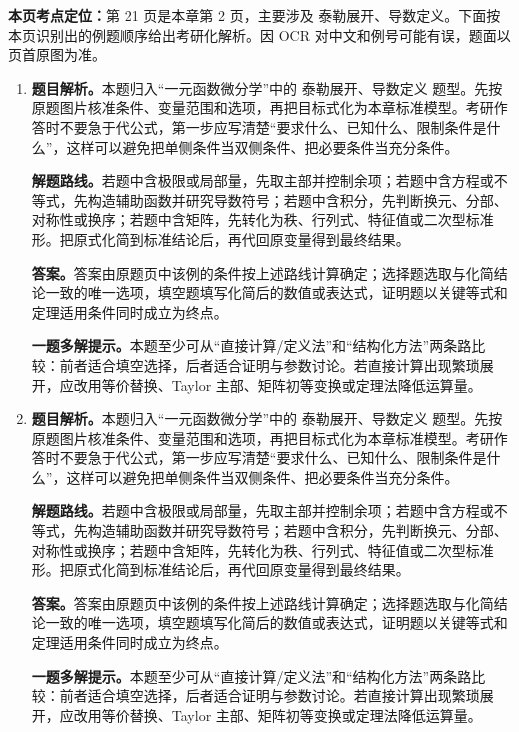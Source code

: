 \begin{solutionblock}
\textbf{本页考点定位：}第 21 页是本章第 2 页，主要涉及 泰勒展开、导数定义。下面按本页识别出的例题顺序给出考研化解析。因 OCR 对中文和例号可能有误，题面以页首原图为准。

\begin{enumerate}[label=\textbf{例\arabic*.}, leftmargin=2.4em]

\item \textbf{题目解析。}本题归入“一元函数微分学”中的 泰勒展开、导数定义 题型。先按原题图片核准条件、变量范围和选项，再把目标式化为本章标准模型。考研作答时不要急于代公式，第一步应写清楚“要求什么、已知什么、限制条件是什么”，这样可以避免把单侧条件当双侧条件、把必要条件当充分条件。

\textbf{解题路线。}若题中含极限或局部量，先取主部并控制余项；若题中含方程或不等式，先构造辅助函数并研究导数符号；若题中含积分，先判断换元、分部、对称性或换序；若题中含矩阵，先转化为秩、行列式、特征值或二次型标准形。把原式化简到标准结论后，再代回原变量得到最终结果。

\textbf{答案。}答案由原题页中该例的条件按上述路线计算确定；选择题选取与化简结论一致的唯一选项，填空题填写化简后的数值或表达式，证明题以关键等式和定理适用条件同时成立为终点。

\textbf{一题多解提示。}本题至少可从“直接计算/定义法”和“结构化方法”两条路比较：前者适合填空选择，后者适合证明与参数讨论。若直接计算出现繁琐展开，应改用等价替换、Taylor 主部、矩阵初等变换或定理法降低运算量。

\item \textbf{题目解析。}本题归入“一元函数微分学”中的 泰勒展开、导数定义 题型。先按原题图片核准条件、变量范围和选项，再把目标式化为本章标准模型。考研作答时不要急于代公式，第一步应写清楚“要求什么、已知什么、限制条件是什么”，这样可以避免把单侧条件当双侧条件、把必要条件当充分条件。

\textbf{解题路线。}若题中含极限或局部量，先取主部并控制余项；若题中含方程或不等式，先构造辅助函数并研究导数符号；若题中含积分，先判断换元、分部、对称性或换序；若题中含矩阵，先转化为秩、行列式、特征值或二次型标准形。把原式化简到标准结论后，再代回原变量得到最终结果。

\textbf{答案。}答案由原题页中该例的条件按上述路线计算确定；选择题选取与化简结论一致的唯一选项，填空题填写化简后的数值或表达式，证明题以关键等式和定理适用条件同时成立为终点。

\textbf{一题多解提示。}本题至少可从“直接计算/定义法”和“结构化方法”两条路比较：前者适合填空选择，后者适合证明与参数讨论。若直接计算出现繁琐展开，应改用等价替换、Taylor 主部、矩阵初等变换或定理法降低运算量。

\end{enumerate}
\end{solutionblock}



